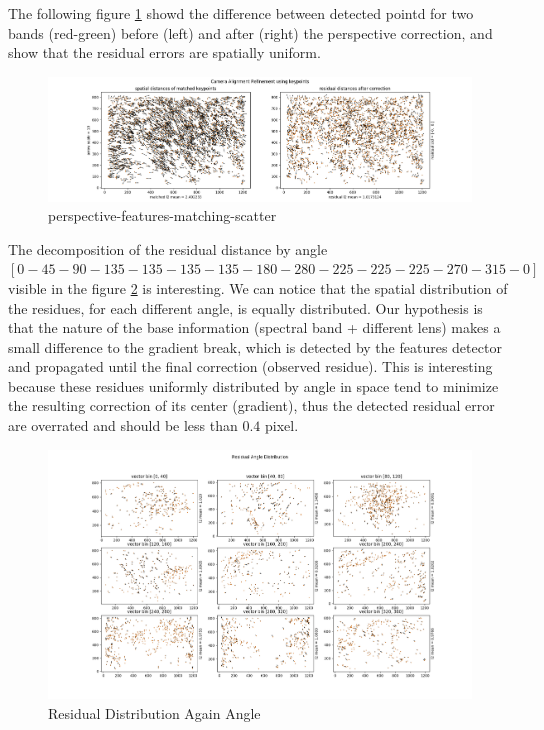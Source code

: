 \documentclass[]{elsarticle}
\begin{document}
	The following figure \ref{fig:perspective-features-matching-scatter} showd the difference between detected pointd for two bands (red-green)
	before (left) and after (right) the perspective correction, and show that the residual errors are spatially uniform.
	
	\begin{figure}[!htb]
		\centering
		\includegraphics[width=\linewidth]{../figures/perspective-features-matching-scatter.png}
		\caption{perspective-features-matching-scatter}
		\label{fig:perspective-features-matching-scatter}
	\end{figure}
	
	
	The decomposition of the residual distance by angle $[0-45-90-135-135-135-135-180-280-225-225-225-270-315-0]$ visible in the figure \ref{fig:residual-angle} is interesting.
	We can notice that the spatial distribution of the residues, for each different angle, is equally distributed.
	Our hypothesis is that the nature of the base information (spectral band + different lens) makes a small difference to the gradient break,
	which is detected by the features detector and propagated until the final correction (observed residue).
	This is interesting because these residues uniformly distributed by angle in space tend to minimize the resulting correction of its center (gradient),
	thus the detected residual error are overrated and should be less than $0.4$ pixel.
	
	\begin{figure}[!htb]
		\centering
		\includegraphics[width=\linewidth]{../figures/perspective-features-residual.png}
		\caption{Residual Distribution Again Angle}
		\label{fig:residual-angle}
	\end{figure}
	
\end{document}
